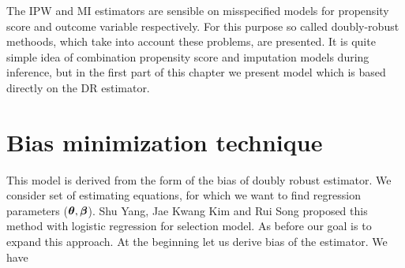 \documentclass[
  letterpaper,
  DIV=11,
  numbers=noendperiod]{scrreprt}
\begin{document}
The IPW and MI estimators are sensible on misspecified models for
propensity score and outcome variable respectively. For this purpose so
called doubly-robust methoods, which take into account these problems,
are presented. It is quite simple idea of combination propensity score
and imputation models during inference, but in the first part of this
chapter we present model which is based directly on the DR estimator.

\hypertarget{bias-minimization-technique}{%
\section{Bias minimization
technique}\label{bias-minimization-technique}}

This model is derived from the form of the bias of doubly robust
estimator. We consider set of estimating equations, for which we want to
find regression parameters (\(\boldsymbol{\theta}, \boldsymbol{\beta}\)). Shu Yang, Jae Kwang
Kim and Rui Song proposed this method with logistic regression for
selection model. As before our goal is to expand this approach. At the
beginning let us derive bias of the estimator. We have
\end{document}
